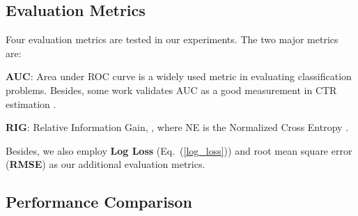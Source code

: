 \documentclass[conference]{IEEEtran}
\begin{document}
\subsection{Evaluation Metrics}
Four evaluation metrics are tested in our experiments. The two major metrics are:

\textbf{AUC}: Area under ROC curve is a widely used metric in evaluating classification problems. Besides, some work validates AUC as a good measurement in CTR estimation \cite{graepel2010web}.

\textbf{RIG}: Relative Information Gain, , where NE is the Normalized Cross Entropy \cite{he2014practical}.

Besides, we also employ \textbf{Log Loss} (Eq.~(\ref{log_loss})) and root mean square error (\textbf{RMSE}) as our additional evaluation metrics.


\subsection{Performance Comparison}
\end{document}

